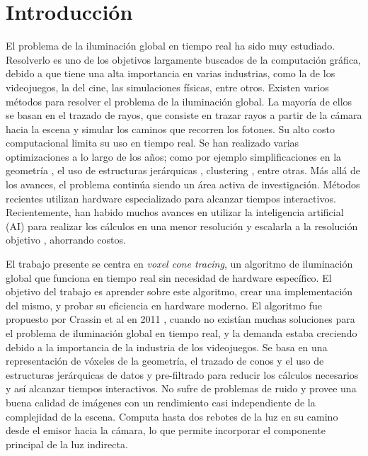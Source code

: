 \chapter{Introducción}


El problema de la iluminación global en tiempo real ha sido muy estudiado.
Resolverlo es uno de los objetivos largamente buscados de la computación gráfica, debido a que tiene una alta importancia en varias industrias, como la de los videojuegos, la del cine, las simulaciones físicas, entre otros.
Existen varios métodos para resolver el problema de la iluminación global.
La mayoría de ellos se basan en el trazado de rayos, que consiste en trazar rayos a partir de la cámara hacia la escena y simular los caminos que recorren los fotones.
Su alto costo computacional limita su uso en tiempo real.
Se han realizado varias optimizaciones a lo largo de los años; como por ejemplo simplificaciones en la geometría \cite{gigavoxels}, el uso de estructuras jerárquicas \cite{real-time-photon-mapping}, clustering \cite{faster-photon-mapping}, entre otras.
Más allá de los avances, el problema continúa siendo un área activa de investigación.
Métodos recientes utilizan hardware especializado para alcanzar tiempos interactivos.
Recientemente, han habido muchos avances en utilizar la inteligencia artificial (AI) para realizar los cálculos en una menor resolución y escalarla a la resolución objetivo \cite{image-super-resolution-survey}, ahorrando costos.

El trabajo presente se centra en \textit{voxel cone tracing}, un algoritmo de iluminación global que funciona en tiempo real sin necesidad de hardware específico.
El objetivo del trabajo es aprender sobre este algoritmo, crear una implementación del mismo, y probar su eficiencia en hardware moderno.
El algoritmo fue propuesto por Crassin et al en 2011 \cite{voxel-cone-tracing}, cuando no existían muchas soluciones para el problema de iluminación global en tiempo real, y la demanda estaba creciendo debido a la importancia de la industria de los videojuegos.
Se basa en una representación de vóxeles de la geometría, el trazado de conos y el uso de estructuras jerárquicas de datos y pre-filtrado para reducir los cálculos necesarios y así alcanzar tiempos interactivos.
No sufre de problemas de ruido y provee una buena calidad de imágenes con un rendimiento casi independiente de la complejidad de la escena.
Computa hasta dos rebotes de la luz en su camino desde el emisor hacia la cámara, lo que permite incorporar el componente principal de la luz indirecta.

